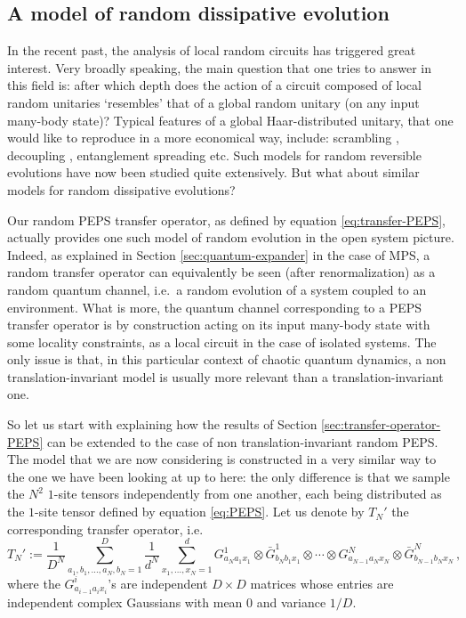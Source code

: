 \documentclass{amsart}
\begin{document}
\subsection{A model of random dissipative evolution} \hfill\par\smallskip
\label{sec:random-evolution}

In the recent past, the analysis of local random circuits has triggered great interest. Very broadly speaking, the main question that one tries to answer in this field is: after which depth does the action of a circuit composed of local random unitaries `resembles' that of a global random unitary (on any input many-body state)? Typical features of a global Haar-distributed unitary, that one would like to reproduce in a more economical way, include: scrambling \cite{BF1,BHH,HM}, decoupling \cite{BF2}, entanglement spreading \cite{HNRV,HNV} etc. Such models for random reversible evolutions have now been studied quite extensively. But what about similar models for random dissipative evolutions?

Our random PEPS transfer operator, as defined by equation \eqref{eq:transfer-PEPS}, actually provides one such model of random evolution in the open system picture. Indeed, as explained in Section \ref{sec:quantum-expander} in the case of MPS, a random transfer operator can equivalently be seen (after renormalization) as a random quantum channel, i.e.~a random evolution of a system coupled to an environment. What is more, the quantum channel corresponding to a PEPS transfer operator is by construction acting on its input many-body state with some locality constraints, as a local circuit in the case of isolated systems. The only issue is that, in this particular context of chaotic quantum dynamics, a non translation-invariant model is usually more relevant than a translation-invariant one.

So let us start with explaining how the results of Section \ref{sec:transfer-operator-PEPS} can be extended to the case of non translation-invariant random PEPS. The model that we are now considering is constructed in a very similar way to the one we have been looking at up to here: the only difference is that we sample the $N^2$ $1$-site tensors independently from one another, each being distributed as the $1$-site tensor defined by equation \eqref{eq:PEPS}. Let us denote by $T_N'$ the corresponding transfer operator, i.e.
\begin{equation} \label{eq:transfer-PEPS-ind}
    T_N' := \frac{1}{D^N} \sum_{a_1,b_1,\ldots,a_N,b_N=1}^D \frac{1}{d^N} \sum_{x_1,\ldots,x_N=1}^d G_{a_Na_1x_1}^1 \otimes \bar{G}_{b_Nb_1x_1}^1\otimes \cdots\otimes G_{a_{N-1}a_Nx_N}^N \otimes \bar{G}_{b_{N-1}b_Nx_N}^N \, ,
\end{equation}
where the $G_{a_{i-1}a_ix_i}^i$'s are independent $D\times D$ matrices whose entries are independent complex Gaussians with mean $0$ and variance $1/D$.
\end{document}

